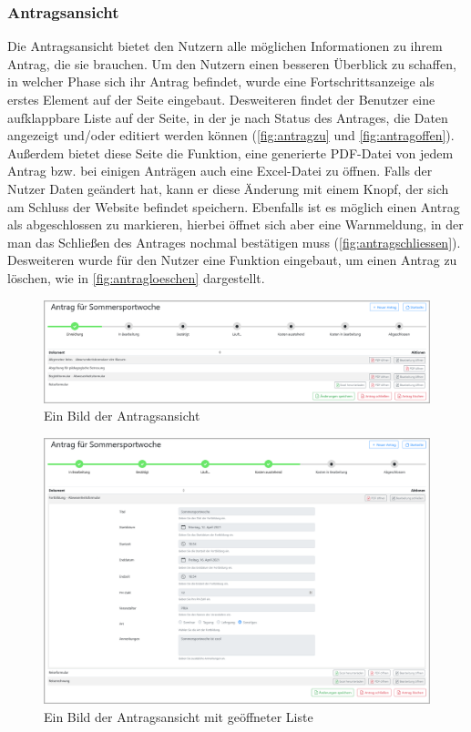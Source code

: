 \subsubsection{Antragsansicht}
\label{chapter:implementierung-frontend-komponenten-antragsansicht}
Die Antragsansicht bietet den Nutzern alle möglichen Informationen zu ihrem Antrag, die sie brauchen. Um den Nutzern einen besseren Überblick zu schaffen, in welcher Phase sich ihr Antrag befindet, wurde eine Fortschrittsanzeige als erstes Element auf der Seite eingebaut. Desweiteren findet der Benutzer eine aufklappbare Liste auf der Seite, in der je nach Status des Antrages, die Daten angezeigt und/oder editiert werden können (\autoref{fig:antragzu} und \autoref{fig:antragoffen}). Außerdem bietet diese Seite die Funktion, eine generierte PDF-Datei von jedem Antrag bzw. bei einigen Anträgen auch eine Excel-Datei zu öffnen. Falls der Nutzer Daten geändert hat, kann er diese Änderung mit einem Knopf, der sich am Schluss der Website befindet speichern. Ebenfalls ist es möglich einen Antrag als abgeschlossen zu markieren, hierbei öffnet sich aber eine Warnmeldung, in der man das Schließen des Antrages nochmal bestätigen muss (\autoref{fig:antragschliessen}). Desweiteren wurde für den Nutzer eine Funktion eingebaut, um einen Antrag zu löschen, wie in \autoref{fig:antragloeschen} dargestellt.
\begin{figure}[H]
	\centering
	\includegraphics[width=1\linewidth]{images/ldehner_implementierung/antrag_zu}
	\caption[Antragsansicht]{Ein Bild der Antragsansicht}
	\label{fig:antragzu}
\end{figure}
\begin{figure}[H]
	\centering
	\includegraphics[width=1\linewidth]{images/ldehner_implementierung/antrag}
	\caption[Antragsansicht geöffnet]{Ein Bild der Antragsansicht mit geöffneter Liste}
	\label{fig:antragoffen}
\end{figure}
